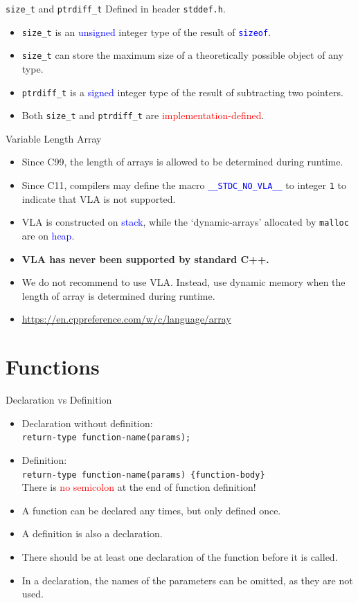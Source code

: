 \documentclass{beamer}
\newcommand{\red}[1]{\textcolor{red}{#1}}
\newcommand{\blue}[1]{\textcolor{blue}{#1}}
\newcommand{\ttt}[1]{\texttt{#1}}
\newcommand{\bluett}[1]{\blue{\ttt{#1}}}
\begin{document}
\begin{frame}{\ttt{size\_t} and \ttt{ptrdiff\_t}}
	Defined in header \ttt{stddef.h}.
	\begin{itemize}
		\item \ttt{size\_t} is an \blue{unsigned} integer type of the result of \bluett{sizeof}.
		\item \ttt{size\_t} can store the maximum size of a theoretically possible object of any type.
		\item \ttt{ptrdiff\_t} is a \blue{signed} integer type of the result of subtracting two pointers.
		\item Both \ttt{size\_t} and \ttt{ptrdiff\_t} are \red{implementation-defined}.
	\end{itemize}
\end{frame}

\begin{frame}{Variable Length Array}
	\begin{itemize}
		\item Since C99, the length of arrays is allowed to be determined during runtime.
		\item Since C11, compilers may define the macro \bluett{\_\_STDC\_NO\_VLA\_\_} to integer \ttt{1} to indicate that VLA is not supported.
		\item VLA is constructed on \blue{stack}, while the `dynamic-arrays' allocated by \ttt{malloc} are on \blue{heap}.
		\pause
		\item \textbf{VLA has never been supported by standard C++.}
		\item We do not recommend to use VLA. Instead, use dynamic memory when the length of array is determined during runtime.
		\item \url{https://en.cppreference.com/w/c/language/array}
	\end{itemize}
\end{frame}

\section{Functions}

\begin{frame}{Declaration vs Definition}
	\begin{itemize}
		\item Declaration without definition:\\
		\ttt{return-type function-name(params);}
		\item Definition:\\
		\ttt{return-type function-name(params) \{function-body\}}\\
		There is \red{no semicolon} at the end of function definition!
		\pause
		\item A function can be declared any times, but only defined once.
		\item A definition is also a declaration.
		\item There should be at least one declaration of the function before it is called.
		\item In a declaration, the names of the parameters can be omitted, as they are not used.
	\end{itemize}
\end{frame}
\end{document}
